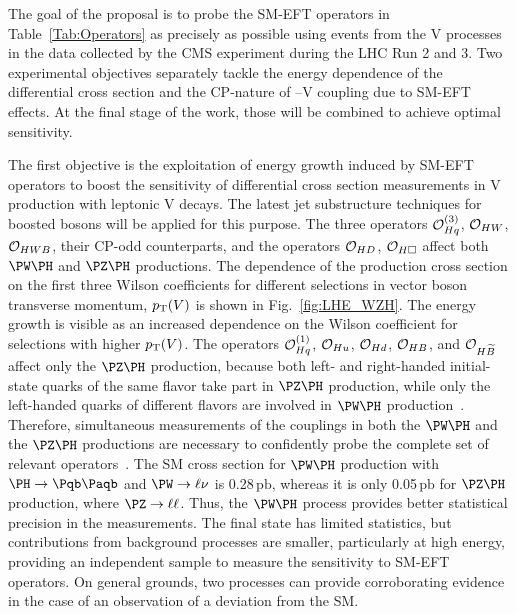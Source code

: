 \documentclass[a4paper,11pt]{article}
\newcommand{\Pb}{{{\Pqb}}\xspace}
\newcommand{\PAb}{{{{\Paqb}}}\xspace}
\renewcommand{\PV}{{{{V}}}\xspace}
\newcommand{\VH}{{{\PV}{\PH}}\xspace}
\newcommand{\pb} {\mbox{\ensuremath{\,\text{pb}}}\xspace}
\begin{document}
The goal of the proposal is to probe the SM-EFT operators in Table~\ref{Tab:Operators} as precisely as possible using events from the \VH processes in the data collected by the CMS experiment during the LHC Run 2 and 3. 
Two experimental objectives separately tackle the energy dependence of the differential cross section and the CP-nature of \PH--\PV coupling due to SM-EFT effects.
At the final stage of the work, those will be combined to achieve optimal sensitivity.

The first objective is the exploitation of energy growth
induced by SM-EFT operators
to boost the sensitivity of differential cross section measurements in \VH production with leptonic \PV decays.
The latest jet substructure techniques for boosted \PH bosons will be applied for this purpose.
The three operators ${\cal O}^{(3)}_{Hq}$, ${\cal O}_{HW}$, ${\cal O}_{HWB}$, their CP-odd counterparts, and the operators ${\cal O}_{HD}$, ${\cal O}_{H\square}$ affect both $\PW\PH$ and $\PZ\PH$ productions. 
The dependence of the production cross section on the first three Wilson coefficients for different selections in vector boson transverse momentum, $\pt(\PV)$ is shown in Fig.~\ref{fig:LHE_WZH}. 
The energy growth is visible as an increased dependence on the Wilson coefficient for selections with higher $\pt(\PV)$. 
The operators ${\cal O}^{(1)}_{Hq}$, ${\cal O}_{Hu}$, ${\cal O}_{Hd}$, ${\cal O}_{HB}$, and ${\cal O}_{H\widetilde{B}}$ affect only the $\PZ\PH$ production, 
because both left- and right-handed initial-state quarks of the same flavor take part in $\PZ\PH$ production, while only the left-handed quarks of different flavors are involved in $\PW\PH$ production~\cite{Falkowski:2014tna,Banerjee:2018bio}. 
Therefore, simultaneous measurements of the couplings in both the $\PW\PH$ and the $\PZ\PH$ productions are necessary to confidently probe the complete set of relevant operators~\cite{Banerjee:2019twi}.
The SM cross section for $\PW\PH$ production with  $\PH\rightarrow\Pb\PAb$ and $\PW\rightarrow\ell\nu$  is 0.28\pb, whereas it is only 0.05\pb for $\PZ\PH$ production, where $\PZ\rightarrow\ell\ell$.
Thus, the $\PW\PH$ process provides better statistical precision in the measurements. 
The \PZ final state has limited statistics, 
but contributions from background processes are smaller, 
particularly at high energy, 
providing an independent sample to measure the sensitivity to SM-EFT operators. 
On general grounds, 
two processes can provide corroborating evidence in the case of an observation of a deviation from the SM.
\end{document}
